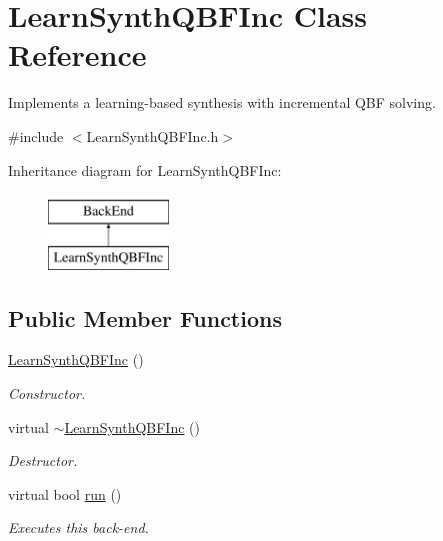 \hypertarget{classLearnSynthQBFInc}{\section{Learn\-Synth\-Q\-B\-F\-Inc Class Reference}
\label{classLearnSynthQBFInc}
}


Implements a learning-\/based synthesis with incremental Q\-B\-F solving.  




{\ttfamily \#include $<$Learn\-Synth\-Q\-B\-F\-Inc.\-h$>$}

Inheritance diagram for Learn\-Synth\-Q\-B\-F\-Inc\-:\begin{figure}[H]
\begin{center}
\leavevmode
\includegraphics[height=2.000000cm]{classLearnSynthQBFInc}
\end{center}
\end{figure}
\subsection*{Public Member Functions}
\begin{DoxyCompactItemize}
\item 
\hyperlink{classLearnSynthQBFInc_a85d45b72b949faaa910d7a7569cc4877}{Learn\-Synth\-Q\-B\-F\-Inc} ()
\begin{DoxyCompactList}\small\item\em Constructor. \end{DoxyCompactList}\item 
virtual \hyperlink{classLearnSynthQBFInc_a9d9e0b1d3aa1ea85da6884af34cdc003}{$\sim$\-Learn\-Synth\-Q\-B\-F\-Inc} ()
\begin{DoxyCompactList}\small\item\em Destructor. \end{DoxyCompactList}\item 
virtual bool \hyperlink{classLearnSynthQBFInc_af9563d1f3c657ed4730ee49e041bc300}{run} ()
\begin{DoxyCompactList}\small\item\em Executes this back-\/end. \end{DoxyCompactList}\end{DoxyCompactItemize}
